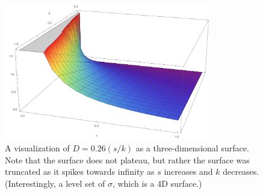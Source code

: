 \documentclass[12pt]{article}
\begin{document}
\begin{figure}[hp]
    \centering
    \includegraphics[width=0.8\textwidth]{DosageSurface.pdf}
    \caption{A visualization of \(D = 0.26(s/k)\) as a three-dimensional surface. Note that the surface does not plateau, but rather the surface was truncated as it spikes towards infinity as \(s\) increases and \(k\) decreases. (Interestingly, a level set of \(\sigma\), which is a 4D surface.)}
    \label{fig:dosagesurface}
\end{figure}
\end{document}
